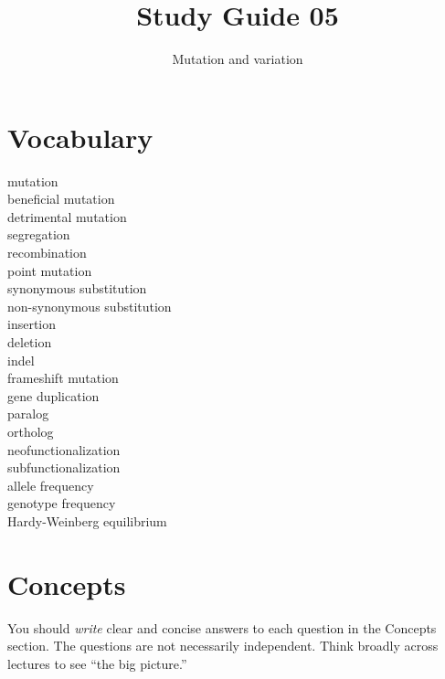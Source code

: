 \documentclass[letterpaper]{tufte-handout}
\title{Study Guide 05\hfill}
\author{Mutation and variation}
\date{} %
\begin{document}
\maketitle	%

\section{Vocabulary}

\begin{multicols}{2}
mutation \\
beneficial mutation \\
detrimental mutation \\
segregation \\
recombination \\
point mutation \\
synonymous substitution \\
non-synonymous substitution \\
insertion \\
deletion \\
indel \\
frameshift mutation \\
gene duplication \\
paralog \\
ortholog \\
neofunctionalization \\
subfunctionalization \\
allele frequency \\
genotype frequency \\
Hardy-Weinberg equilibrium 
\end{multicols}


\section{Concepts}

You should \emph{write} clear and concise answers to each question in the Concepts section.  The questions are not necessarily independent.  Think broadly across lectures to see ``the big picture.'' 
\end{document}
